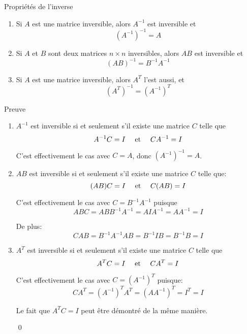 \documentclass[a4paper]{article}
\begin{document}
\begin{parag}{Propriétés de l'inverse}
    \begin{enumerate}[left=0pt]
        \item Si $A$ est une matrice inversible, alors $A^{-1}$ est inversible et
            \[\left(A^{-1}\right)^{-1} = A\]

        \item Si $A$ et $B$ sont deux matrices $n \times n$ inversibles, alors $AB$ est inversible et
            \[\left(AB\right)^{-1} = B^{-1} A ^{-1}\]

        \item Si $A$ est une matrice inversible, alors $A^{T}$ l'est aussi, et
            \[\left(A^{T}\right)^{-1} = \left(A^{-1}\right)^T\]
    \end{enumerate}

    \begin{subparag}{Preuve}
        \begin{enumerate}[left=0pt]
            \item $A^{-1}$ est inversible si et seulement s'il existe une matrice $C$ telle que
            \[A^{-1} C = I \quad \text{ et } \quad C A^{-1} = I\]

            C'est effectivement le cas avec $C = A$, donc $\left(A^{-1}\right)^{-1} = A$.
            \item $AB$ est inversible si et seulement s'il existe une matrice $C$ telle que:
            \[\left(AB\right) C = I \mathspace \text{ et } \mathspace C\left(AB\right) = I\]

            C'est effectivement le cas avec $C = B^{-1} A^{-1}$ puisque
            \[ABC = ABB^{-1}A^{-1} = AIA^{-1} = A A^{-1} = I\]

            De plus:
            \[CAB = B^{-1} A^{-1} A B = B^{-1} I B = B^{-1} B = I\]


            \item $A^{T}$ est inversible si et seulement s'il existe une matrice $C$ telle que
            \[A^T C = I \quad \text{ et } \quad C A^T = I\]

            C'est effectivement le cas avec $C = \left(A^{-1}\right)^T$ puisque:
            \[C A^{T} = \left(A^{-1}\right)^T A^{T} = \left(A A^{-1}\right)^T = I^T = I\]

            Le fait que $A^T C = I$ peut être démontré de la même manière.

            \qed
        \end{enumerate}

    \end{subparag}

\end{parag}
\end{document}
